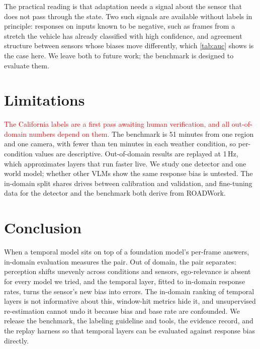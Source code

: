 \documentclass[conference]{IEEEtran}
\newcommand{\draftnote}[1]{\textcolor{red}{#1}}
\begin{document}
The practical reading is that adaptation needs a signal about the sensor that does not pass through the state. Two such signals are available without labels in principle: responses on inputs known to be negative, such as frames from a stretch the vehicle has already classified with high confidence, and agreement structure between sensors whose biases move differently, which \cref{tab:auc} shows is the case here. We leave both to future work; the benchmark is designed to evaluate them.

\section{Limitations}
\label{sec:limits}

\draftnote{The California labels are a first pass awaiting human verification, and all out-of-domain numbers depend on them.} The benchmark is 51 minutes from one region and one camera, with fewer than ten minutes in each weather condition, so per-condition values are descriptive. Out-of-domain results are replayed at 1\,Hz, which approximates layers that run faster live. We study one detector and one world model; whether other VLMs show the same response bias is untested. The in-domain split shares drives between calibration and validation, and fine-tuning data for the detector and the benchmark both derive from ROADWork.

\section{Conclusion}
\label{sec:conclusion}

When a temporal model sits on top of a foundation model's per-frame answers, in-domain evaluation measures the pair. Out of domain, the pair separates: perception shifts unevenly across conditions and sensors, ego-relevance is absent for every model we tried, and the temporal layer, fitted to in-domain response rates, turns the sensor's new bias into errors. The in-domain ranking of temporal layers is not informative about this, window-hit metrics hide it, and unsupervised re-estimation cannot undo it because bias and base rate are confounded. We release the benchmark, the labeling guideline and tools, the evidence record, and the replay harness so that temporal layers can be evaluated against response bias directly.

{\small


}
\end{document}
